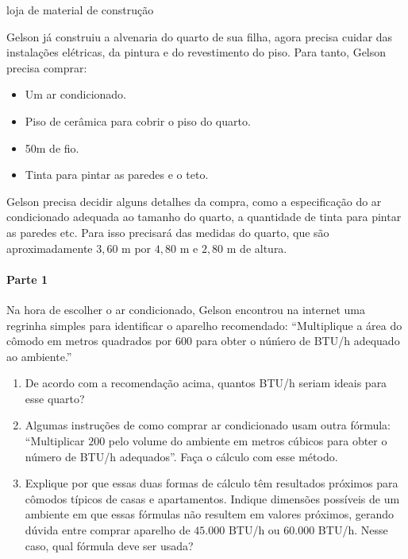 \label{\detokenize{GE504-2::doc}}\label{\detokenize{GE504-2:explorando-dimensao}}
\begin{task}{loja de material de construção}



Gelson já construiu a alvenaria do quarto de sua filha, agora precisa cuidar das instalações elétricas, da pintura e do revestimento do piso. Para tanto, Gelson precisa comprar:
\begin{itemize}
\item {} 
Um ar condicionado.

\item {} 
Piso de cerâmica para cobrir o piso do quarto.

\item {} 
50m de fio.

\item {} 
Tinta para pintar as paredes e o teto.

\end{itemize}

Gelson precisa decidir alguns detalhes da compra, como a especificação do ar condicionado adequada ao tamanho do quarto, a quantidade de tinta para pintar as paredes etc. Para isso precisará das medidas do quarto, que são aproximadamente $3{,}60$ m por $4{,}80$ m e $2{,}80$ m de altura.

\paragraph{Parte 1}

Na hora de escolher o ar condicionado, Gelson encontrou na internet uma regrinha simples para identificar o aparelho recomendado: “Multiplique a área do cômodo em metros quadrados por 600 para obter o núḿero de BTU/h adequado ao ambiente.”
\begin{enumerate}
\item {} 
De acordo com a recomendação acima, quantos BTU/h seriam ideais para esse quarto?

\item {} 
Algumas instruções de como comprar ar condicionado usam outra fórmula: “Multiplicar $200$ pelo volume do ambiente em metros cúbicos para obter o número de BTU/h adequados”. Faça o cálculo com esse método.

\item {} 
Explique por que essas duas formas de cálculo têm resultados próximos para cômodos típicos de casas e apartamentos. Indique dimensões possíveis de um ambiente em que essas fórmulas não resultem em valores próximos, gerando dúvida entre comprar aparelho de $45.000$ BTU/h ou $60.000$ BTU/h. Nesse caso, qual fórmula deve ser usada?


\end{enumerate}
\end{task}
